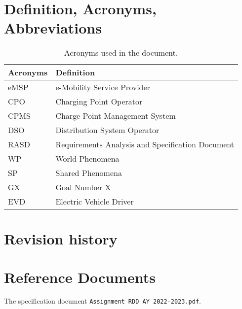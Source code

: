 \section{Definition, Acronyms, Abbreviations}
\label{sec:definition_acronyms_abbreviations}
\begin{table}[H]
    \begin{center}
        \begin{tabular}{ |l|l| }
            \hline
            \textbf{Acronyms} & \textbf{Definition}                              \\
            \hline
            eMSP              & e-Mobility Service Provider                      \\
            \hline
            CPO               & Charging Point Operator                          \\
            \hline
            CPMS              & Charge Point Management System                   \\
            \hline
            DSO               & Distribution System Operator                     \\
            \hline
            RASD              & Requirements Analysis and Specification Document \\
            \hline
            WP                & World Phenomena                                  \\
            \hline
            SP                & Shared Phenomena                                 \\
            \hline
            GX                & Goal Number X                                    \\
            \hline
            EVD               & Electric Vehicle Driver                          \\
            \hline
        \end{tabular}
        \caption{Acronyms used in the document.}
        \label{tab:acronyms}
    \end{center}
\end{table}


\section{Revision history}
\label{sec:revision_history}


\section{Reference Documents}
\label{sec:reference_documents}
The specification document \verb|Assignment RDD AY 2022-2023.pdf|.


